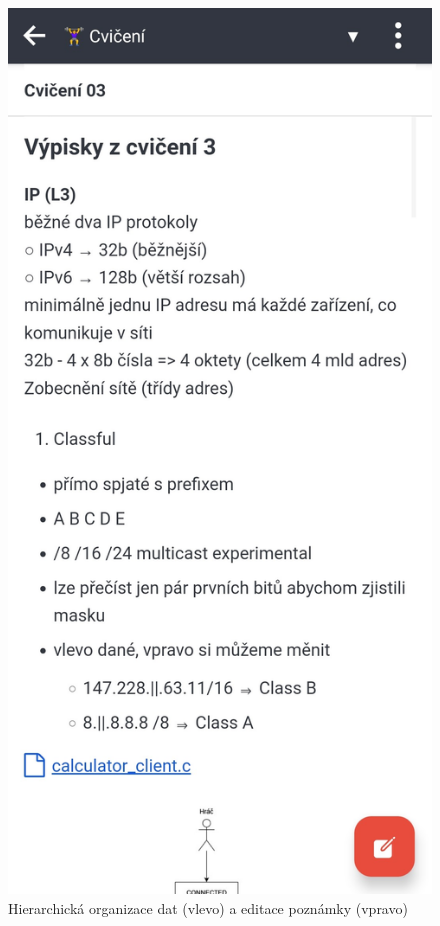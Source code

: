 \documentclass[czech, bc, kiv, he, iso690numb]{fasthesis}
\begin{document}
\begin{figure}[h!]
\begin{minipage}[h]{0.3\textwidth}
  \end{minipage}
  \hspace{30pt}
  \begin{minipage}[h]{0.3\textwidth}
    \includegraphics[width=\textwidth]{img/BP-Runt/Joplin/poznamka_Joplin_telefon.jpg}
  \end{minipage}
  \caption{Hierarchická organizace dat (vlevo) a editace poznámky (vpravo)}
  \label{fig:hierarchie_Joplin}
\end{figure}
\end{document}
